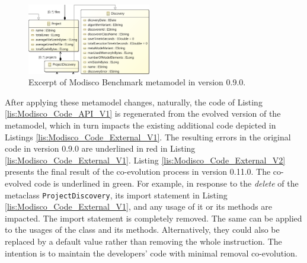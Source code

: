 \begin{figure}
	
	\centering
	\includegraphics[width=0.48\textwidth]{pics/chapter1pics/example.PNG}
	\caption{Excerpt of Modisco Benchmark metamodel in version 0.9.0.}
	\label{fig: BMM}
	\vspace{-5mm}
\end{figure}

After applying these metamodel changes, naturally, the code of Listing \ref{lis:Modisco_Code_API_V1} is regenerated from the evolved version of the metamodel, which in turn impacts the existing additional code depicted in Listings \ref{lis:Modisco_Code_External_V1}. 
The resulting errors in the original code in version 0.9.0 are underlined in red in Listing \ref{lis:Modisco_Code_External_V1}. 
Listing \ref{lis:Modisco_Code_External_V2} presents the final result of the co-evolution process in version 0.11.0. The co-evolved code is underlined in green. 
For example, in response to the \textit{delete} of the metaclass \texttt{ProjectDiscovery}, its import statement {\small{}} in Listing \ref{lis:Modisco_Code_External_V1}, and any usage of it or its methods are impacted. The import statement is completely removed. The same can be applied to the usages of the class and its methods. Alternatively, they could also be replaced by a default value rather than removing the whole instruction. The intention is to maintain the developers' code with minimal removal co-evolution. 

